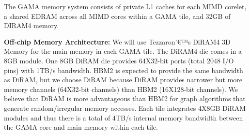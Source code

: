 



\noindent
The GAMA memory system consists of private L1 caches for each MIMD corelet, a shared EDRAM across all MIMD cores within a GAMA tile, and 32GB of DIRAM4 memory.    

\noindent
\textbf{Off-chip Memory Architecture:} 
We will use  Tezzaron'€™s DiRAM4 3D Memory for the main memory in each GAMA tile.  The DiRAM4 die comes in a 8GB module. One 8GB DiRAM die provides 64X32-bit ports (total 2048 I/O pins) with 1TB/s bandwidth. HBM2 is expected to provide the same bandwidth as DiRAM, but we choose DiRAM because DiRAM provides narrower but more memory channels (64X32-bit channels) than HBM2 (16X128-bit channels). We believe that DiRAM is more advantageous than HBM2 for graph algorithms that generate random/irregular memory accesses. Each tile integrates 4X8GB DiRAM modules and thus there is a total of 4TB/s internal memory bandwidth between the GAMA core and main memory within each tile. 

